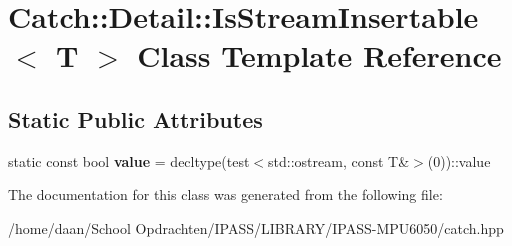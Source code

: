 \hypertarget{classCatch_1_1Detail_1_1IsStreamInsertable}{}\section{Catch\+:\+:Detail\+:\+:Is\+Stream\+Insertable$<$ T $>$ Class Template Reference}
\label{classCatch_1_1Detail_1_1IsStreamInsertable}
\subsection*{Static Public Attributes}
\begin{DoxyCompactItemize}
\item 
\mbox{\label{classCatch_1_1Detail_1_1IsStreamInsertable_a42818b09ae5851126a70ee263769e309}} 
static const bool {\bfseries value} = decltype(test$<$std\+::ostream, const T\&$>$(0))\+::value
\end{DoxyCompactItemize}


The documentation for this class was generated from the following file\+:\begin{DoxyCompactItemize}
\item 
/home/daan/\+School Opdrachten/\+I\+P\+A\+S\+S/\+L\+I\+B\+R\+A\+R\+Y/\+I\+P\+A\+S\+S-\/\+M\+P\+U6050/catch.\+hpp\end{DoxyCompactItemize}
